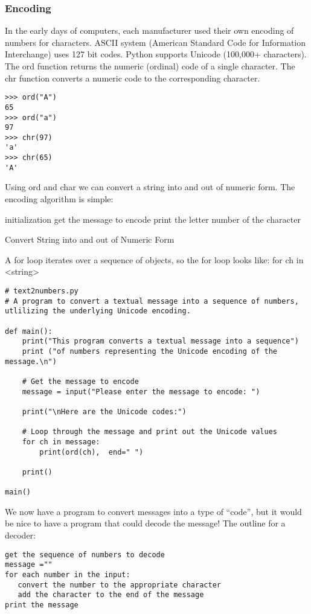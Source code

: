 \documentclass[12pt,a4paper,final,twoside,onecolumn,titlepage]{book}
\begin{document}
\subsubsection{Encoding}
In the early days of computers, each manufacturer used their own encoding of numbers for characters. ASCII system (American Standard Code for Information Interchange) uses 127 bit codes. Python supports Unicode (100,000+ characters). The ord function returns the numeric (ordinal) code of a single character. The chr function converts a numeric code to the corresponding character.
\begin{lstlisting}
>>> ord("A")
65
>>> ord("a")
97
>>> chr(97)
'a'
>>> chr(65)
'A'
\end{lstlisting}
Using ord and char we can convert a string into and out of numeric form. The encoding algorithm is simple:
\begin{algorithm}[H]
\SetAlgoLined
{}
initialization\;
get the message to encode\;
print the letter number of the character
\caption{Convert String into and out of Numeric Form}
\end{algorithm}

A for loop iterates over a sequence of objects, so the for loop looks like:
for ch in <string>

\begin{lstlisting}
# text2numbers.py
# A program to convert a textual message into a sequence of numbers, utlilizing the underlying Unicode encoding.

def main():
    print("This program converts a textual message into a sequence")
    print ("of numbers representing the Unicode encoding of the message.\n")
    
    # Get the message to encode
    message = input("Please enter the message to encode: ")

    print("\nHere are the Unicode codes:")

    # Loop through the message and print out the Unicode values
    for ch in message:
        print(ord(ch),  end=" ")
        
    print()

main()
\end{lstlisting}

We now have a program to convert messages into a type of “code”, but it would be nice to have a program that could decode the message! The outline for a decoder:
\begin{lstlisting}
get the sequence of numbers to decode
message =""
for each number in the input:
   convert the number to the appropriate character
   add the character to the end of the message
print the message
\end{lstlisting}
\end{document}

